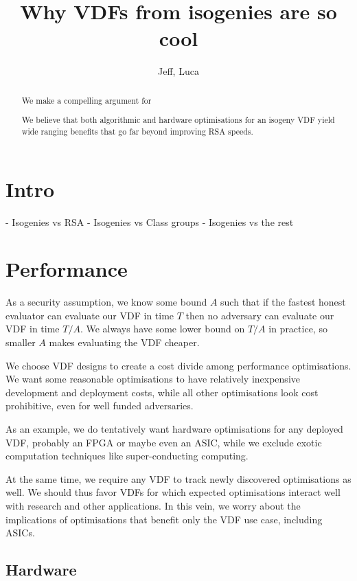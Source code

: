 \documentclass{article}
\title{Why VDFs from isogenies are so cool}
\author{Jeff, Luca}
\date{}
\begin{document}
\maketitle

\begin{abstract}
We make a compelling argument for 

We believe that both algorithmic and hardware optimisations for an
isogeny VDF yield wide ranging benefits that go far beyond improving
RSA speeds.

\end{abstract}

\section{Intro}


- Isogenies vs RSA
- Isogenies vs Class groups
- Isogenies vs the rest





\section{Performance}

As a security assumption, we know some bound $A$ such that if the
fastest honest evaluator can evaluate our VDF in time $T$ then no
adversary can evaluate our VDF in time $T/A$.  
We always have some lower bound on $T/A$ in practice, so smaller
$A$ makes evaluating the VDF cheaper.

We choose VDF designs to create a cost divide among performance
optimisations.  We want some reasonable optimisations to have
relatively inexpensive development and deployment costs, while
all other optimisations look cost prohibitive, even for well funded
adversaries.

As an example, we do tentatively want hardware optimisations for
any deployed VDF, probably an FPGA or maybe even an ASIC, while we
exclude exotic computation techniques like super-conducting computing.

At the same time, we require any VDF to track newly discovered
optimisations as well.  We should thus favor VDFs for which expected
optimisations interact well with research and other applications.
In this vein, we worry about the implications of optimisations that
benefit only the VDF use case, including ASICs.

\subsection{Hardware}
\end{document}
